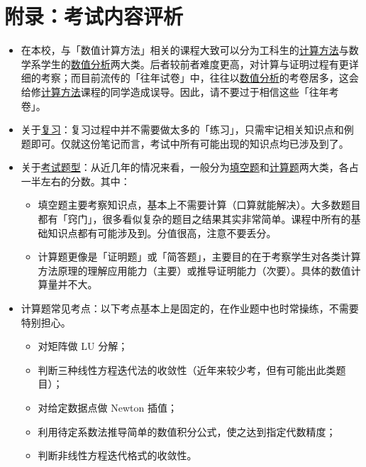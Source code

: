 \documentclass[opensource,b5paper,sourcefont]{qyxf-book}
\newcommand{\tl}{\setlength{\itemsep}{0pt}\setlength{\parskip}{0pt}}
\renewcommand{\emph}[1]{\uline{#1}}
\begin{document}
\chapter{附录：考试内容评析}
\begin{itemize}
\item 在本校，与「数值计算方法」相关的课程大致可以分为工科生的\emph{计算方法}与数学系学生的\emph{数值分析}两大类。后者较前者难度更高，对计算与证明过程有更详细的考察；而目前流传的「往年试卷」中，往往以\emph{数值分析}的考卷居多，这会给修\emph{计算方法}课程的同学造成误导。因此，请不要过于相信这些「往年考卷」。
\item 关于\emph{复习}：复习过程中并不需要做太多的「练习」，只需牢记相关知识点和例题即可。仅就这份笔记而言，考试中所有可能出现的知识点均已涉及到了。
\item 关于\emph{考试题型}：从近几年的情况来看，一般分为\emph{填空题}和\emph{计算题}两大类，各占一半左右的分数。其中：
\begin{itemize}
    \item 填空题主要考察知识点，基本上不需要计算（口算就能解决）。大多数题目都有「窍门」，很多看似复杂的题目之结果其实非常简单。课程中所有的基础知识点都有可能涉及到。分值很高，注意不要丢分。
    \item 计算题更像是「证明题」或「简答题」，主要目的在于考察学生对各类计算方法原理的理解应用能力（主要）或推导证明能力（次要）。具体的数值计算量并不大。
\end{itemize}
\item 计算题常见考点：以下考点基本上是固定的，在作业题中也时常操练，不需要特别担心。
\begin{itemize}\tl
    \item 对矩阵做 LU 分解；
    \item 判断三种线性方程迭代法的收敛性（近年来较少考，但有可能出此类题目）；
    \item 对给定数据点做 Newton 插值；
    \item 利用待定系数法推导简单的数值积分公式，使之达到指定代数精度；
    \item 判断非线性方程迭代格式的收敛性。
\end{itemize}
\end{itemize}

\printindex
\end{document}
